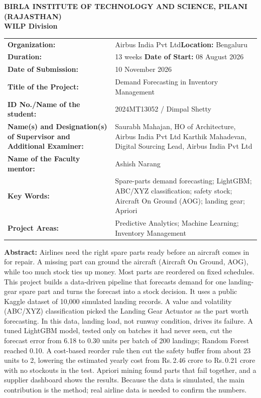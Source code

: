 \documentclass[12pt,oneside]{report}
\newcommand{\INR}{Rs.\,}
\newcommand{\StudentName}{Dimpal Shetty}
\newcommand{\StudentID}{2024MT13052}
\newcommand{\OrgName}{Airbus India Pvt Ltd}
\newcommand{\OrgPlace}{Bengaluru}
\begin{document}
\begin{singlespace}
\begin{center}
{\bfseries BIRLA INSTITUTE OF TECHNOLOGY AND SCIENCE, PILANI\\(RAJASTHAN)\\WILP Division\par}
\end{center}
\vspace{0.5em}
\noindent
\begin{tabularx}{\textwidth}{@{}>{\raggedright\arraybackslash}p{4.6cm} L@{}}
\textbf{Organization:} & \OrgName \hfill \textbf{Location:} \OrgPlace\\[3pt]
\textbf{Duration:} & 13 weeks \hfill \textbf{Date of Start:} 08 August 2026\\[3pt]
\textbf{Date of Submission:} & 10 November 2026\\[3pt]
\textbf{Title of the Project:} & Demand Forecasting in Inventory Management\\[3pt]
\textbf{ID No./Name of the student:} & \StudentID{} / \StudentName\\[3pt]
\textbf{Name(s) and Designation(s) of Supervisor and Additional Examiner:} &
  Saurabh Mahajan, HO of Architecture, \OrgName{}\newline
  Karthik Mahadevan, Digital Sourcing Lead, \OrgName{}\\[3pt]
\textbf{Name of the Faculty mentor:} & Ashish Narang\\[3pt]
\textbf{Key Words:} & Spare-parts demand forecasting; LightGBM; ABC/XYZ classification; safety stock; Aircraft On Ground (AOG); landing gear; Apriori\\[3pt]
\textbf{Project Areas:} & Predictive Analytics; Machine Learning; Inventory Management\\
\end{tabularx}

\vspace{0.6em}
\noindent\textbf{Abstract:}
Airlines need the right spare parts ready before an aircraft comes in for repair. A missing part can ground the aircraft (Aircraft On Ground, AOG), while too much stock ties up money. Most parts are reordered on fixed schedules. This project builds a data-driven pipeline that forecasts demand for one landing-gear spare part and turns the forecast into a stock decision. It uses a public Kaggle dataset of 10,000 simulated landing records. A value and volatility (ABC/XYZ) classification picked the Landing Gear Actuator as the part worth forecasting. In this data, landing load, not runway condition, drives its failure. A tuned LightGBM model, tested only on batches it had never seen, cut the forecast error from 6.18 to 0.30 units per batch of 200 landings; Random Forest reached 0.10. A cost-based reorder rule then cut the safety buffer from about 23 units to 2, lowering the estimated yearly cost from \INR 2.46 crore to \INR 0.21 crore with no stockouts in the test. Apriori mining found parts that fail together, and a supplier dashboard shows the results. Because the data is simulated, the main contribution is the method; real airline data is needed to confirm the numbers.


\end{singlespace}
\end{document}
